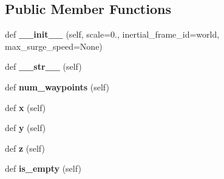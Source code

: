 \subsection*{Public Member Functions}
\begin{DoxyCompactItemize}
\item 
\mbox{\label{classuuv__waypoints_1_1waypoint__set_1_1WaypointSet_a08bab2a7be0eaf986e54640361447c58}} 
def {\bfseries \+\_\+\+\_\+init\+\_\+\+\_\+} (self, scale=0., inertial\+\_\+frame\+\_\+id=\textquotesingle{}world\textquotesingle{}, max\+\_\+surge\+\_\+speed=None)
\item 
\mbox{\label{classuuv__waypoints_1_1waypoint__set_1_1WaypointSet_ab2b2155a02632e3244608bd942539927}} 
def {\bfseries \+\_\+\+\_\+str\+\_\+\+\_\+} (self)
\item 
\mbox{\label{classuuv__waypoints_1_1waypoint__set_1_1WaypointSet_af6f79d95c49e31ad1d53e97c910610fe}} 
def {\bfseries num\+\_\+waypoints} (self)
\item 
\mbox{\label{classuuv__waypoints_1_1waypoint__set_1_1WaypointSet_a8c88dfa0e0f9fd7dfac32a54ba9ca48f}} 
def {\bfseries x} (self)
\item 
\mbox{\label{classuuv__waypoints_1_1waypoint__set_1_1WaypointSet_a790b0ba31e2504e76832a5572df05fe8}} 
def {\bfseries y} (self)
\item 
\mbox{\label{classuuv__waypoints_1_1waypoint__set_1_1WaypointSet_a161732a5ba23bc502569bc8bce5bd1cd}} 
def {\bfseries z} (self)
\item 
\mbox{\label{classuuv__waypoints_1_1waypoint__set_1_1WaypointSet_a8175c1ffe05c7b478bbf100e887e147f}} 
def {\bfseries is\+\_\+empty} (self)
\item 
\mbox{\label{classuuv__waypoints_1_1waypoint__set_1_1WaypointSet_a70aba72390d98e4f48b1b3db87b0d858}} 

\end{DoxyCompactItemize}
